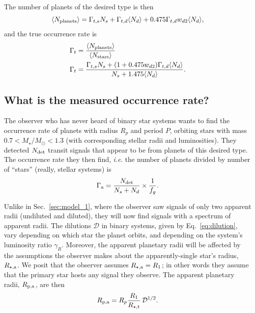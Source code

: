 \documentclass{emulateapj}
\begin{document}
The number of planets of the desired type is then
\begin{equation}
\langle N_{\rm planets} \rangle = 
\Gamma_{t,s}N_s + \Gamma_{t,d}\langle N_d\rangle + 
0.475\Gamma_{t,d}w_{d2} \langle N_d\rangle,
\end{equation}
and the true occurrence rate is
\begin{align}
\Gamma_t &= \frac{\langle N_{\rm planets} \rangle }{\langle N_{\rm stars} 
\rangle} \\
\Gamma_t &= 
\frac{
	\Gamma_{t,s}N_s + (1+0.475w_{d2})\Gamma_{t,d}\langle N_d\rangle
	}{
	N_s + 1.475 \langle N_d \rangle
	}.
\end{align}




\subsection{What is the measured occurrence rate?}

The observer who has never heard of binary star systems wants to find the 
occurrence rate of planets with radius $R_p$ and period $P$, orbiting stars 
with mass $0.7<M_\star/M_\odot < 1.3$ (with corresponding stellar radii and 
luminosities).
They detected $N_{\rm det}$ transit signals that appear to be from planets of 
this desired type.
The occurrence rate they then find, {\it i.e.} the number of planets divided 
by number of ``stars'' (really, stellar systems) is
\begin{equation}
\Gamma_{\rm a } = \frac{N_{\rm det}}{N_s + N_d} \times \frac{1}{f_g}.
\end{equation}

Unlike in Sec.~\ref{sec:model_1}, where the observer saw signals of only two 
apparent radii (undiluted and diluted), they will now find signals with a 
spectrum of apparent radii.
The dilutions $\mathcal{D}$ in binary systems, given by Eq.~\ref{eq:dilution}, 
vary depending on which star the planet orbits, and depending on the system's 
luminosity ratio $\gamma_R$.
Moreover, the apparent planetary radii will be affected by the assumptions the 
observer makes about the apparently-single star's radius, $R_{\star,{\rm a}}$.
We posit that the observer assumes $R_{\star,{\rm a}} = R_1$; in other words 
they assume that the primary star hosts any signal they observe.
The apparent planetary radii, $R_{\rm p, a}$, are then
\begin{equation}
R_{p,{\rm a}} = R_p 
\frac{R_1}
{R_{\star,{\rm t}}}
\,\mathcal{D}^{1/2}.
\end{equation}
\end{document}

